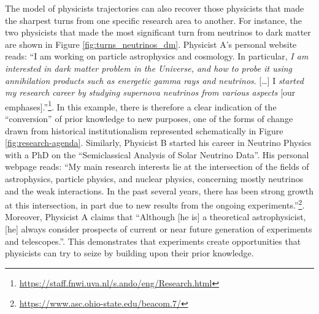 \documentclass{article}
\begin{document}
The model of physicists trajectories can also recover those physicists that made the sharpest turns from one specific research area to another. For instance, the two physicists that made the most significant turn from neutrinos to dark matter are shown in Figure \ref{fig:turns_neutrinos_dm}. Physicist A's personal website reads: ``I am working on particle astrophysics and cosmology. In particular, \textit{I am interested in dark matter problem in the Universe, and how to probe it using annihilation products such as energetic gamma rays and neutrinos}. [\dots]  I \textit{started my research career by studying supernova neutrinos from various aspects} [our emphases].''\footnote{\url{https://staff.fnwi.uva.nl/s.ando/eng/Research.html}}. In this example, there is therefore a clear indication of the ``conversion'' of prior knowledge to new purposes, one of the forms of change drawn from historical institutionalism represented schematically in Figure \ref{fig:research-agenda}. Similarly, Physicist B started his career in Neutrino Physics with a PhD on the ``Semiclassical Analysis of Solar Neutrino Data''.  His personal webpage reads: ``My main research interests lie at the intersection of the fields of astrophysics, particle physics, and nuclear physics, concerning mostly neutrinos and the weak interactions. In the past several years, there has been strong growth at this intersection, in part due to new results from the ongoing experiments.''\footnote{\url{https://www.asc.ohio-state.edu/beacom.7/}}. Moreover, Physicist A claims that ``Although [he is] a theoretical astrophysicist, [he] always consider prospects of current or near future generation of experiments and telescopes.''. This demonstrates that experiments create opportunities that physicists can try to seize by building upon their prior knowledge. 
\end{document}
